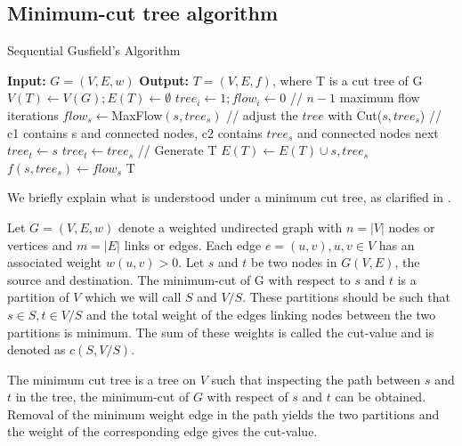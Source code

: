 \subsection{Minimum-cut tree algorithm}

\begin{algorithm}
\caption{Sequential Gusfield's Algorithm}
\label{mincutgusfield}
\begin{algorithmic}
\STATE \textbf{Input:} $G = (V,E,w)$ 
\STATE \textbf{Output:} $T = (V,E,f)$, where T is a cut tree of G
\STATE $V(T) \leftarrow V(G); E(T) \leftarrow \emptyset$
\STATE $tree_i \leftarrow 1; flow_i \leftarrow 0$
\ENDFOR
\STATE // $n - 1$ maximum flow iterations
\STATE $flow_s \leftarrow $MaxFlow$(s, tree_s)$
\STATE // adjust the $tree$ with Cut($s,tree_s$)
\STATE // c1 contains s and connected nodes, c2 contains $tree_s$ and connected nodes
			\STATE next
			\STATE $tree_t \leftarrow s$
			\STATE $tree_t \leftarrow tree_s$
		\ENDIF
	\ENDFOR
\ENDFOR
\STATE // Generate T
\STATE $E(T) \leftarrow E(T) \cup {s, tree_s}$
\STATE $f({s,tree_s}) \leftarrow flow_s$
\ENDFOR
\RETURN T
\end{algorithmic}
\end{algorithm}


We briefly explain what is understood under a minimum cut tree, as clarified in \cite{saha2006dynamic}. 

Let $G = (V,E,w)$ denote a weighted undirected graph with $n = |V|$ nodes or vertices and $m = |E|$ links or edges. Each edge $e = (u, v), u,v \in V$ has an associated weight $w(u,v) > 0$. Let $s$ and $t$ be two nodes in $G(V,E)$, the source and destination. The minimum-cut of G with respect to $s$ and $t$ is a partition of $V$ which we will call $S$ and $V/S$. These partitions should be such that $s \in S, t \in V/S$ and the total weight of the edges linking nodes between the two partitions is minimum. The sum of these weights is called the cut-value and is denoted as $c(S,V/S)$. 

The minimum cut tree is a tree on $V$ such that inspecting the path between $s$ and $t$ in the tree, the minimum-cut of $G$ with respect of $s$ and $t$ can be obtained. Removal of the minimum weight edge in the path yields the two partitions and the weight of the corresponding edge gives the cut-value.

